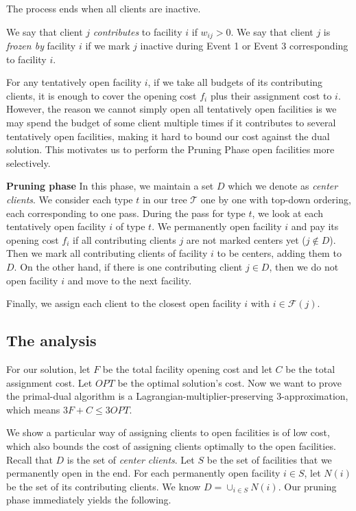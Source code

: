 The process ends when all clients are inactive.

\begin{defn}
We say that client $j$ {\it contributes} to facility $i$ if $w_{ij} > 0$.
We say that client $j$ is {\it frozen by} facility $i$ if we mark $j$ inactive during Event 1 or Event 3 corresponding to facility $i$.
\end{defn}

For any tentatively open facility $i$, if we take all budgets of its contributing clients, it is enough to cover the opening cost $f_i$ plus their assignment cost to $i$. However, the reason we cannot simply open all tentatively open facilities is we may spend the budget of some client multiple times if it contributes to several tentatively open facilities, making it hard to bound our cost against the dual solution. This motivates us to perform the Pruning Phase open facilities more selectively.

\textbf{Pruning phase}
In this phase, we maintain a set $D$ which we denote as \textit{center clients}. We consider each type $t$ in our tree $\mathcal{T}$ one by one with top-down ordering, each corresponding to one pass. During the pass for type $t$, we look at each tentatively open facility $i$ of type $t$. We permanently open facility $i$ and pay its opening cost $f_i$ if all contributing clients $j$ are not marked centers yet ($j \not \in D$). Then we mark all contributing clients of facility $i$ to be centers, adding them to $D$. On the other hand, if there is one contributing client $j \in D$, then we do not open facility $i$ and move to the next facility.

Finally, we assign each client to the closest open facility $i$ with $i \in \mathcal{F}(j)$.

\subsection{The analysis}

For our solution, let $F$ be the total facility opening cost and let $C$ be the total assignment cost.
Let $OPT$ be the optimal solution's cost.
Now we want to prove the primal-dual algorithm is a Lagrangian-multiplier-preserving 3-approximation, which means
$3F + C \le 3 OPT$. 

We show a particular way of assigning clients to open facilities is of low cost, which also
bounds the cost of assigning clients optimally to the open facilities. 
%
Recall that $D$ is the set of \textit{center clients}. Let $S$ be the set of facilities
that we permanently open in the end. For each permanently open facility $i \in S$, let
$N(i)$ be the set of its contributing clients. We know $D = \cup_{i \in S} N(i)$. Our
pruning phase immediately yields the following.

